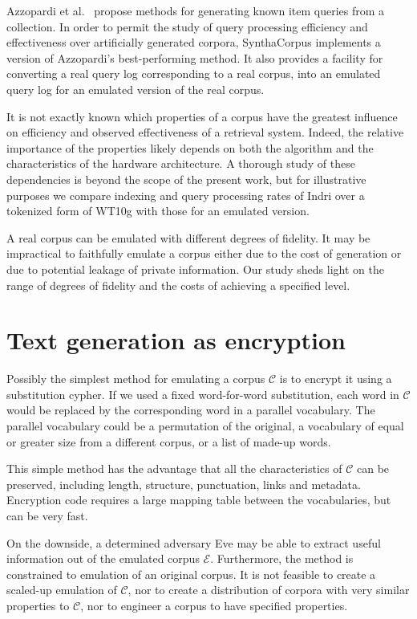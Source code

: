 \documentclass[11pt]{report}
\newcommand{\script}[1]{$\mathcal{#1}$}
\begin{document}
Azzopardi et
al.~\cite{AzzopardideRijke2006}\cite{AzzopardideRijkeBalog2007} propose methods for generating known item queries
from a collection. In order to permit the study of query processing
efficiency and effectiveness
over artificially generated corpora, SynthaCorpus implements a version of Azzopardi's
best-performing method.   It also provides a facility for converting a
real query log corresponding to a real corpus, into an emulated query
log for an emulated version of the real corpus.

It is not exactly known which properties of a corpus have the greatest
influence on efficiency and observed effectiveness of a retrieval
system.  Indeed, the relative importance of the properties likely depends on
both the algorithm and the characteristics of the hardware
architecture.  A thorough study of these dependencies is beyond the
scope of the present work, but for illustrative purposes we compare
indexing and query processing rates of Indri over a tokenized form of
WT10g with those for an emulated version.

A real corpus can be emulated with different degrees of
fidelity.  It may be impractical to faithfully emulate a corpus either
due to the cost of generation or due to potential leakage of
private information.  Our study sheds light on the range
of degrees of fidelity and the costs of achieving a specified level.

\section{Text generation as encryption}
Possibly the simplest method for emulating a corpus \script{C} is to
encrypt it using a substitution cypher.  If we used a fixed
word-for-word substitution, each word in \script{C} would be replaced
by the corresponding word in a parallel vocabulary.  The parallel
vocabulary could be a permutation of the original, a vocabulary of
equal or greater size from a different corpus, or a list of made-up
words. 

This simple method has the advantage that all the characteristics of
\script{C} can be preserved, including length, structure, punctuation, links
and metadata.  Encryption code requires a large mapping table
between the vocabularies, but can be very fast.

On the downside, a determined adversary Eve may be able to extract
useful information out of the emulated corpus \script{E}. Furthermore,
the method is constrained to emulation of an original corpus.  It is
not feasible to create a scaled-up emulation of \script{C}, nor to
create a distribution of corpora with very similar properties to
\script{C}, nor to engineer a corpus to have specified properties.
\end{document}
